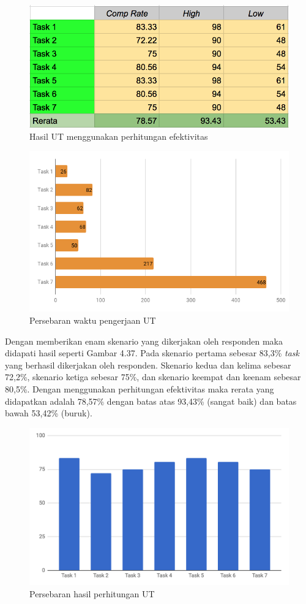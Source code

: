 	\begin{figure}
		\centering
		\includegraphics[width=\linewidth]{pics/hasil_sauro}
		\caption{Hasil UT menggunakan perhitungan efektivitas}
	\end{figure}
	\begin{figure}
		\centering
		\includegraphics[width=\linewidth]{pics/waktu-UT}
		\caption{Persebaran waktu pengerjaan UT}
	\end{figure}
	Dengan memberikan enam skenario yang dikerjakan oleh responden maka didapati hasil seperti Gambar 4.37. Pada skenario pertama sebesar 83,3\% \textit{task} yang berhasil dikerjakan oleh responden. Skenario kedua dan kelima sebesar 72,2\%, skenario ketiga sebesar 75\%, dan skenario keempat dan keenam sebesar 80,5\%. Dengan menggunakan perhitungan efektivitas maka rerata yang didapatkan adalah 78,57\% dengan batas atas 93,43\% (sangat baik) dan batas bawah 53,42\% (buruk).
	\begin{figure}
		\centering
		\includegraphics[width=\linewidth]{pics/persebaran-hasil-ut}
		\caption{Persebaran hasil perhitungan UT}
	\end{figure}
	

